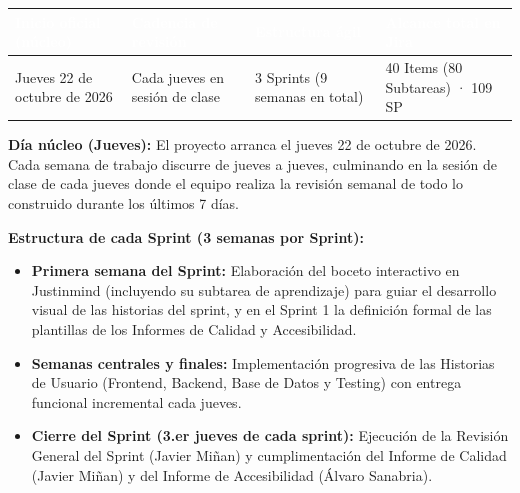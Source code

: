 \documentclass[11pt,a4paper]{article}
\newcommand{\cab}[1]{\textcolor{white}{\small\textbf{#1}}}
\begin{document}
\begin{longtable}{|P{3.6cm}|P{3.6cm}|P{3.6cm}|P{3.6cm}|}
\hline
{}\cab{Inicio oficial (núcleo)} & \cab{Cadencia de revisión} & \cab{Estructura ágil} & \cab{Alcance total en Jira} \\ \hline
{}Jueves 22 de octubre de 2026 & Cada jueves en sesión de clase & 3 Sprints (9 semanas en total) & 40 Items (80 Subtareas) · 109 SP \\ \hline
\end{longtable}

\textbf{\color{gblue}Día núcleo (Jueves):} El proyecto arranca el jueves 22 de octubre de 2026. Cada semana de trabajo discurre de jueves a jueves, culminando en la sesión de clase de cada jueves donde el equipo realiza la revisión semanal de todo lo construido durante los últimos 7 días.

\textbf{Estructura de cada Sprint (3 semanas por Sprint):}
\begin{itemize}
\item \textbf{Primera semana del Sprint:} Elaboración del boceto interactivo en Justinmind (incluyendo su subtarea de aprendizaje) para guiar el desarrollo visual de las historias del sprint, y en el Sprint 1 la definición formal de las plantillas de los Informes de Calidad y Accesibilidad.
\item \textbf{Semanas centrales y finales:} Implementación progresiva de las Historias de Usuario (Frontend, Backend, Base de Datos y Testing) con entrega funcional incremental cada jueves.
\item \textbf{Cierre del Sprint (3.er jueves de cada sprint):} Ejecución de la Revisión General del Sprint (Javier Miñan) y cumplimentación del Informe de Calidad (Javier Miñan) y del Informe de Accesibilidad (Álvaro Sanabria).
\end{itemize}
\end{document}
